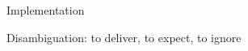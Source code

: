 \documentclass[10pt, xcolor={usenames, dvipsnames}]{beamer}
\begin{document}
\begin{frame}{Implementation}
\end{frame}


  

%     
%     
%     

%     
%     
%     

%     
%             
    



\begin{frame}{Disambiguation: to deliver, to expect, to ignore}
  
  \begin{adjustwidth}{-1.5em}{-1.5em}
    \begin{center}
    
    \end{center}


    
  \end{adjustwidth}

\end{frame}
\end{document}
